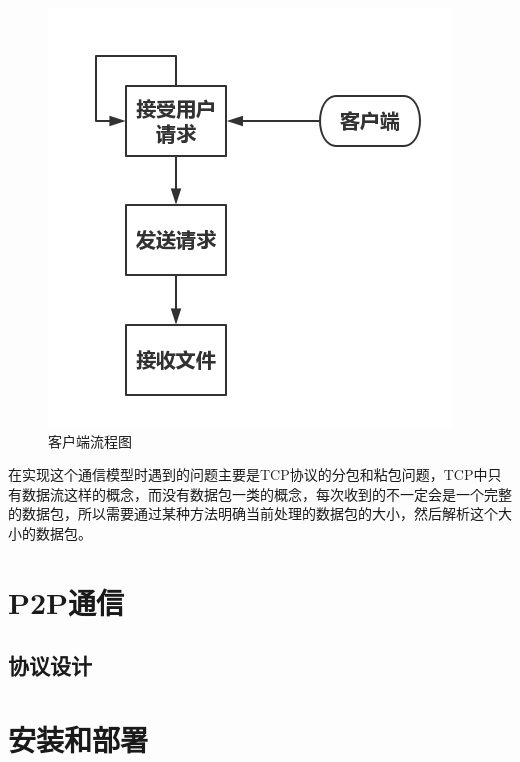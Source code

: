 \documentclass[15pt]{ctexart}
\begin{document}
\begin{figure}[H]
\begin{minipage}{0.45\linewidth}
		    		\includegraphics[width=1\linewidth]{imgs/client.png}
		    		\caption{客户端流程图}
		    		\label{fig:client}
	    		\end{minipage}
	    	\end{figure}
	    	\par 在实现这个通信模型时遇到的问题主要是TCP协议的分包和粘包问题，TCP中只有数据流这样的概念，而没有数据包一类的概念，每次收到的不一定会是一个完整的数据包，所以需要通过某种方法明确当前处理的数据包的大小，然后解析这个大小的数据包。
    	
    	
	
	\section{P2P通信} %
	\label{sec:p2p通信}
		\subsection{协议设计} %
	    \label{sub:协议设计}



	\section{安装和部署} %
	\label{sec:安装和部署}
	
\end{document}
